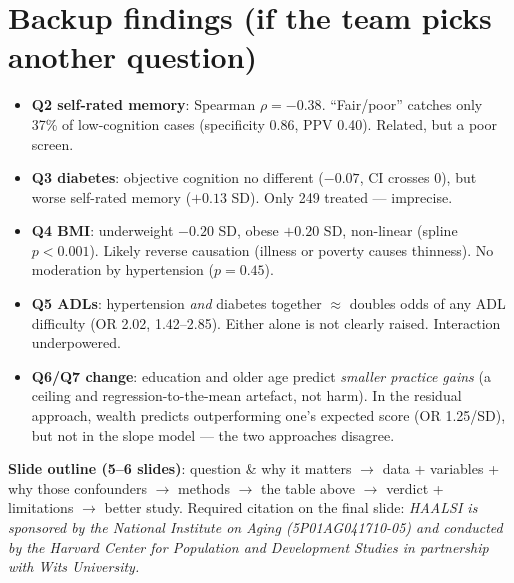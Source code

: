 \documentclass[10pt]{article}
\begin{document}
\section*{Backup findings (if the team picks another question)}
\begin{itemize}
\item \textbf{Q2 self-rated memory}: Spearman $\rho=-0.38$. ``Fair/poor'' catches only 37\% of
  low-cognition cases (specificity 0.86, PPV 0.40). Related, but a poor screen.
\item \textbf{Q3 diabetes}: objective cognition no different ($-0.07$, CI crosses 0), but worse
  self-rated memory ($+0.13$ SD). Only 249 treated --- imprecise.
\item \textbf{Q4 BMI}: underweight $-0.20$ SD, obese $+0.20$ SD, non-linear (spline $p<0.001$).
  Likely reverse causation (illness or poverty causes thinness). No moderation by hypertension
  ($p=0.45$).
\item \textbf{Q5 ADLs}: hypertension \emph{and} diabetes together $\approx$ doubles odds of any ADL
  difficulty (OR 2.02, 1.42--2.85). Either alone is not clearly raised. Interaction underpowered.
\item \textbf{Q6/Q7 change}: education and older age predict \emph{smaller practice gains} (a
  ceiling and regression-to-the-mean artefact, not harm). In the residual approach, wealth
  predicts outperforming one's expected score (OR 1.25/SD), but not in the slope model --- the two
  approaches disagree.
\end{itemize}

\textbf{Slide outline (5--6 slides)}: question \& why it matters $\to$ data + variables + why
those confounders $\to$ methods $\to$ the table above $\to$ verdict + limitations $\to$ better
study. Required citation on the final slide: \emph{HAALSI is sponsored by the National Institute on
Aging (5P01AG041710-05) and conducted by the Harvard Center for Population and Development Studies
in partnership with Wits University.}
\end{document}
